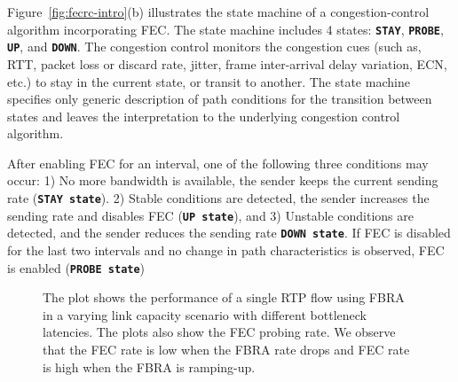 
Figure~\ref{fig:fecrc-intro}(b) illustrates the state machine of a
congestion-control algorithm incorporating FEC. The state machine includes 4
states: \texttt{\textbf{STAY}}, \texttt{\textbf{PROBE}}, \texttt{\textbf{UP}},
and \texttt{\textbf{DOWN}}. The congestion control monitors the congestion
cues (such as, RTT, packet loss or discard rate, jitter, frame inter-arrival
delay variation, ECN, etc.) to stay in the current state, or transit to
another. The state machine specifies only generic description of path
conditions for the transition between states and leaves the interpretation to
the underlying congestion control algorithm.

After enabling FEC for an interval, one of the following three conditions may
occur: 1) No more bandwidth is available, the sender keeps the current sending
rate (\texttt{\textbf{STAY state}}). 2) Stable conditions are detected, the
sender increases the sending rate and disables FEC (\texttt{\textbf{UP
state}}), and 3) Unstable conditions are detected, and the sender reduces the
sending rate \texttt{\textbf{DOWN state}}. If FEC is disabled for the last two
intervals and no change in path characteristics is observed, FEC is enabled
(\texttt{\textbf{PROBE state}})


\begin{figure}
\caption{The plot shows the performance of a single RTP flow using FBRA in a
varying link capacity scenario with different bottleneck latencies. The plots
also show the FEC probing rate. We observe that the FEC rate is low when the
FBRA rate drops and FEC rate is high when the FBRA is ramping-up.}
\label{fig:fecrc-var}
\end{figure}

